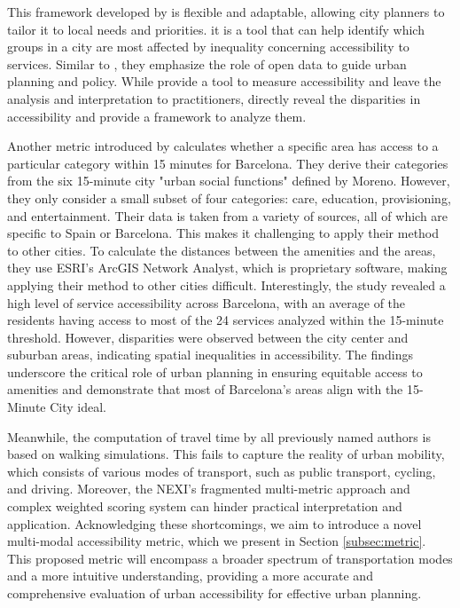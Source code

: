 This framework developed by  is flexible and adaptable, allowing city planners to tailor it to local needs and priorities. 
it is a tool that can help identify which groups in a city are most affected by inequality concerning accessibility to services. 
Similar to , they emphasize the role of open data to guide urban planning and policy.
While  provide a tool to measure accessibility and leave the analysis and interpretation to practitioners,  directly reveal the disparities in accessibility and provide a framework to analyze them.

Another metric introduced by  calculates whether a specific area has access to a particular category within 15 minutes for Barcelona.
They derive their categories from the six 15-minute city "urban social functions" defined by Moreno.
However, they only consider a small subset of four categories: care, education, provisioning, and entertainment.
Their data is taken from a variety of sources, all of which are specific to Spain or Barcelona.
This makes it challenging to apply their method to other cities.
To calculate the distances between the amenities and the areas, they use ESRI's ArcGIS Network Analyst, which is proprietary software, making applying their method to other cities difficult.
Interestingly, the study revealed a high level of service accessibility across Barcelona, with an average of the residents having access to most of the 24 services analyzed within the 15-minute threshold. 
However, disparities were observed between the city center and suburban areas, indicating spatial inequalities in accessibility.
The findings underscore the critical role of urban planning in ensuring equitable access to amenities and demonstrate that most of Barcelona's areas align with the 15-Minute City ideal. 

Meanwhile, the computation of travel time by all previously named authors is based on walking simulations. 
This fails to capture the reality of urban mobility, which consists of various modes of transport, such as public transport, cycling, and driving.
Moreover, the NEXI's fragmented multi-metric approach and complex weighted scoring system can hinder practical interpretation and application.
Acknowledging these shortcomings, we aim to introduce a novel multi-modal accessibility metric, which we present in Section \ref{subsec:metric}.
This proposed metric will encompass a broader spectrum of transportation modes and a more intuitive understanding, providing a more accurate and comprehensive evaluation of urban accessibility for effective urban planning.

